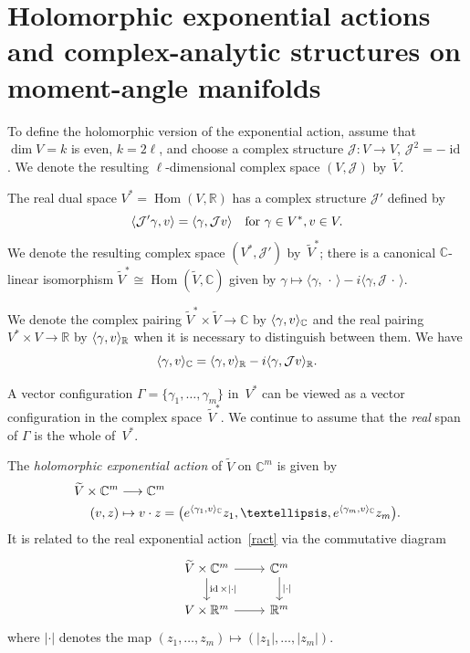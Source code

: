 \documentclass[a4paper]{amsart}
\theoremstyle{definition}
\theoremstyle{remark}
\numberwithin{equation}{section}
\def\R{\mathbb R}
\def\C{\mathbb C}
\def\R{\mathbb R}
\newcommand{\mb}[1]{{\textbf {\textit#1}}}
\def\Hom{\mathop{\mathrm{Hom}}}
\newcommand{\<}{\langle}
\renewcommand{\>}{\rangle}
\begin{document}
\section{Holomorphic exponential actions and complex-analytic structures on moment-angle manifolds}\label{compzk}

To define the holomorphic version of the exponential action, assume that $\dim V=k$ is even, $k=2\ell$, and choose a complex structure $\mathcal J\colon V\to V$, $\mathcal J^2=-\mathop\mathrm{id}$. We denote the resulting $\ell$-dimensional complex space $(V,\mathcal J)$ by~$\widetilde V$.

The real dual space $V^*=\Hom(V,\R)$ has a complex structure $\mathcal J'$ defined by
\[
  \langle\mathcal J'\gamma,\mb v\rangle=\langle\gamma,\mathcal J\mb v\rangle
  \quad\text{for }\gamma\in V^*,\mb v\in V.
\]
We denote the resulting complex space $(V^*,\mathcal J')$ by~$\widetilde V^*$; there is a canonical $\C$-linear isomorphism $\widetilde V^*\cong\Hom(\widetilde V,\C)$ given by $\gamma\mapsto\langle\gamma,\,\cdot\,\rangle-i\langle\gamma,\mathcal J\,\cdot\,\rangle$.

We denote the complex pairing $\widetilde V^*\times\widetilde V\to\C$ by 
$\langle\gamma,\mb v\rangle_\C$ and the real pairing $V^*\times V\to\R$ by 
$\langle\gamma,\mb v\rangle_\R$ when it is necessary to distinguish between them. We have
\[
  \langle\gamma,\mb v\rangle_\C=\langle\gamma,\mb v\rangle_\R-
  i\langle\gamma,\mathcal J\mb v\rangle_\R.
\]

A vector configuration $\Gamma=\{\gamma_1,\ldots,\gamma_m\}$ in~$V^*$ can be viewed as a vector configuration in the complex space~$\widetilde V^*$. We continue to assume that the \emph{real} span of $\Gamma$ is the whole of~$V^*$. 

The \emph{holomorphic exponential action} of $\widetilde V$ on $\C^m$ is given by
\begin{equation}\label{hact}
\begin{aligned}
  \widetilde V\times\C^m&\longrightarrow\C^m\\
  (\mb v,\mb z)&\mapsto \mb v\cdot\mb z=\bigl(e^{\langle\gamma_1,\mb
  v\rangle_\C}z_1,\ldots,e^{\langle\gamma_m,\mb v\rangle_\C}z_m\bigr).
\end{aligned}
\end{equation}
It is related to the real exponential action~\eqref{ract} via the commutative diagram
\[
\begin{tikzcd}
  \widetilde V\times\C^m \ar{r} 
  \ar{d}{\mathop\mathrm{id}\times|\cdot|} & \C^m \ar{d}{|\cdot|}\\
  V\times\R^m \ar{r} & \R^m
\end{tikzcd}
\]
where $|\cdot|$ denotes the map $(z_1,\ldots,z_m)\mapsto(|z_1|,\ldots,|z_m|)$.
\end{document}
